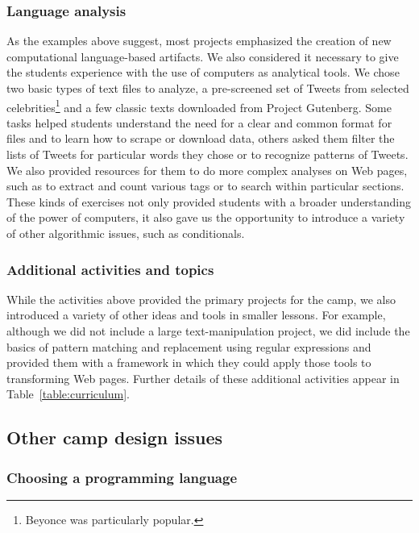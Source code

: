 \subsubsection{Language analysis}

As the examples above suggest, most projects emphasized the creation
of new computational language-based artifacts.  We also considered
it necessary to give the students experience with the use of computers
as analytical tools.  We chose two basic types of text files to
analyze, a pre-screened set of Tweets from selected
celebrities\footnote{Beyonce was particularly popular.} and a few
classic texts downloaded from Project Gutenberg.  Some tasks helped
students understand the need for a clear and common format for
files and to learn how to scrape or download data, others asked
them filter the lists of Tweets for particular words they chose or
to recognize patterns of Tweets.  We also provided resources for
them to do more complex analyses on Web pages, such as to extract
and count various tags or to search within particular sections.
These kinds of exercises not only provided students with a broader 
understanding of the power of computers, it also gave us the opportunity
to introduce a variety of other algorithmic issues, such as conditionals.

\subsubsection{Additional activities and topics}

While the activities above provided the primary projects for the
camp, we also introduced a variety of other ideas and tools in
smaller lessons.  For example, although we did not include a large
text-manipulation project, we did include the basics of pattern
matching and replacement using regular expressions and provided
them with a framework in which they could apply those tools to
transforming Web pages.  Further details of these additional
activities appear in Table~\ref{table:curriculum}.

\subsection{Other camp design issues}

\subsubsection{Choosing a programming language}


